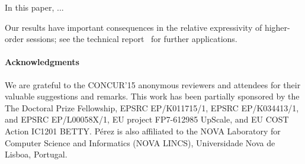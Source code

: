 
In this paper, ...

Our results have important consequences in the relative expressivity
of higher-order sessions; see the  
technical report~\cite{KouzapasPY15} for further applications.

\paragraph{Acknowledgments} 
We are grateful to the CONCUR'15 anonymous reviewers and attendees for their valuable suggestions and remarks.
This work has been partially sponsored by the The Doctoral Prize Fellowship, EPSRC EP/K011715/1, EPSRC EP/K034413/1, and EPSRC EP/L00058X/1, EU project FP7-612985 UpScale, and EU COST Action IC1201 BETTY. P\'{e}rez is also affiliated to the NOVA Laboratory for Computer Science and Informatics (NOVA LINCS), Universidade Nova de Lisboa, Portugal.
